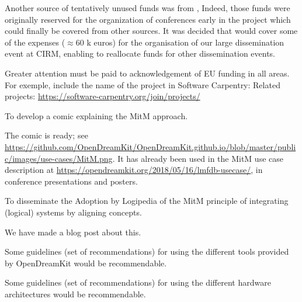 Another source of tentatively unused funds was from ,
Indeed, those funds were originally reserved for the organization of
conferences early in the project which could finally be covered from
other sources. It was decided that  would cover some of
the expenses ($\approx$60 k euros) for the organisation of our large
dissemination event at CIRM, enabling  to reallocate funds
for other dissemination events.

\begin{recommendation}
  Greater attention must be paid to acknowledgement of EU funding in
  all areas. For exemple, include the name of the project in Software
  Carpentry: Related projects:
  \url{https://software-carpentry.org/join/projects/}
\end{recommendation}

\begin{recommendation}
  To develop a comic explaining the MitM approach.
\end{recommendation}
The comic is ready; see
\url{https://github.com/OpenDreamKit/OpenDreamKit.github.io/blob/master/public/images/use-cases/MitM.png}. It
has already been used in the MitM use case description at
\url{https://opendreamkit.org/2018/05/16/lmfdb-usecase/}, in conference presentations and
posters.  

\begin{recommendation}
  To disseminate the Adoption by Logipedia of the MitM principle of
  integrating (logical) systems by aligning concepts.
\end{recommendation}
We have made a blog post about this.

\begin{recommendation}
  Some guidelines (set of recommendations) for using the different
  tools provided by OpenDreamKit would be recommendable.
\end{recommendation}

\begin{recommendation}
  Some guidelines (set of recommendations) for using the different
  hardware architectures would be recommendable.
\end{recommendation}



